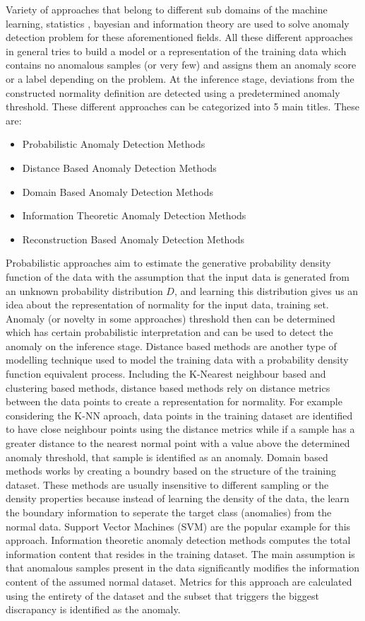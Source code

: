 Variety of approaches that belong to different sub domains of the machine learning, statistics ,
bayesian and information theory are used to solve anomaly detection problem for these aforementioned
fields. All these different approaches in general tries to build a model or a representation of the
training data which contains no anomalous samples (or very few) and assigns them an anomaly score or
a label depending on the problem. At the inference stage, deviations from the constructed normality
definition are detected using a predetermined anomaly threshold. These different approaches can be
categorized into 5 main titles. These are:

\begin{itemize}
  \item Probabilistic Anomaly Detection Methods
  \item Distance Based Anomaly Detection Methods
  \item Domain Based Anomaly Detection Methods
  \item Information Theoretic Anomaly Detection Methods
  \item Reconstruction Based Anomaly Detection Methods  
\end{itemize}

Probabilistic approaches aim to estimate the generative probability density function of the data
with the assumption that the input data is generated from an unknown probability distribution $D$,
and learning this distribution gives us an idea about the representation of normality for the input
data, training set. Anomaly (or novelty in some approaches) threshold then can be determined which has
certain probabilistic interpretation and can be used to detect the anomaly on the inference stage.
\cite{Pimentel:2014:RRN:2588908.2589196} Distance based methods are another type of modelling
technique used to model the training data with a probability density function equivalent process.
Including the K-Nearest neighbour based and clustering based methods, distance based methods rely on
distance metrics between the data points to create a representation for normality. For example
considering the K-NN aproach, data points in the training dataset are identified to have close
neighbour points using the distance metrics while if a sample has a greater distance to the
nearest normal point with a value above the determined anomaly threshold, that sample is identified
as an anomaly. Domain based methods works by creating a boundry based on the structure of the
training dataset. \cite{Pimentel:2014:RRN:2588908.2589196} These methods are usually insensitive to
different sampling or the density properties because instead of learning the density of
the data, the learn the boundary information to seperate the target class (anomalies) from the
normal data. Support Vector Machines (SVM) are the popular example for this approach. Information
theoretic anomaly detection methods computes the total information content that resides in the
training dataset. The main assumption is that anomalous samples present in the data significantly
modifies the information content of the assumed normal dataset. Metrics for this approach are
calculated using the entirety of the dataset and the subset that triggers the biggest discrapancy is
identified as the anomaly. 

